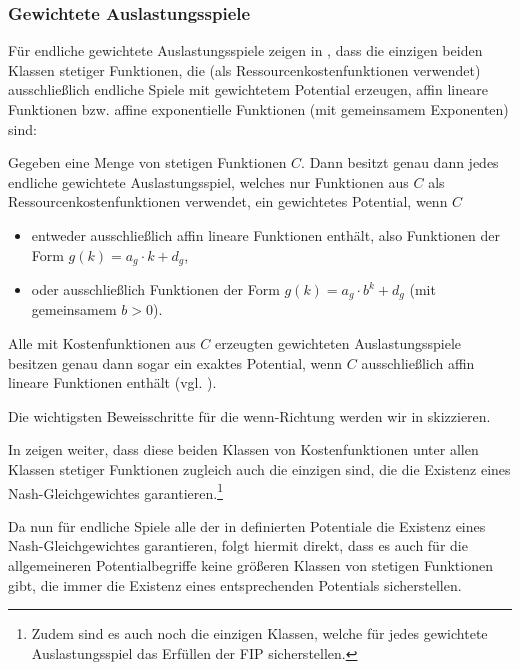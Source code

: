 \subsubsection{Gewichtete Auslastungsspiele}

Für endliche gewichtete Auslastungsspiele zeigen \citeauthor{CharExGewPotinWCG} in \cite[Theorem 3.9]{CharExGewPotinWCG}, dass die einzigen beiden Klassen stetiger Funktionen, die (als Ressourcenkostenfunktionen verwendet) ausschließlich endliche Spiele mit gewichtetem Potential erzeugen, affin lineare Funktionen bzw. affine exponentielle Funktionen (mit gemeinsamem Exponenten) sind:

\begin{satz}\label{satz:CharExGewPotinWCG}
	Gegeben eine Menge von stetigen Funktionen $C$. Dann besitzt genau dann jedes endliche gewichtete Auslastungsspiel, welches nur Funktionen aus $C$ als Ressourcenkostenfunktionen verwendet, ein gewichtetes Potential, wenn $C$
	\begin{itemize}
		\item entweder ausschließlich affin lineare Funktionen enthält, also Funktionen der Form $g(k) = a_g \cdot k + d_g$,
		\item oder ausschließlich Funktionen der Form $g(k) = a_g\cdot b^k + d_g$ (mit gemeinsamem $b > 0$).
	\end{itemize}
	Alle mit Kostenfunktionen aus $C$ erzeugten gewichteten Auslastungsspiele besitzen genau dann sogar ein exaktes Potential, wenn $C$ ausschließlich affin lineare Funktionen enthält (vgl. \cite[Theorem 3.7]{CharExGewPotinWCG}).
\end{satz}

Die wichtigsten Beweisschritte für die \glqq wenn\grqq-Richtung werden wir in  skizzieren.

In \cite[Theorem 5.1]{CharExNGinWCG} zeigen \citeauthor{CharExNGinWCG} weiter, dass diese beiden Klassen von Kostenfunktionen unter allen Klassen stetiger Funktionen zugleich auch die einzigen sind, die die Existenz eines Nash-Gleichgewichtes garantieren.\footnote{Zudem sind es auch noch die einzigen Klassen, welche für jedes gewichtete Auslastungsspiel das Erfüllen der FIP sicherstellen.}

Da nun für endliche Spiele alle der in  definierten Potentiale die Existenz eines Nash-Gleichgewichtes garantieren, folgt hiermit direkt, dass es auch für die allgemeineren Potentialbegriffe keine größeren Klassen von stetigen Funktionen gibt, die immer die Existenz eines entsprechenden Potentials sicherstellen.

